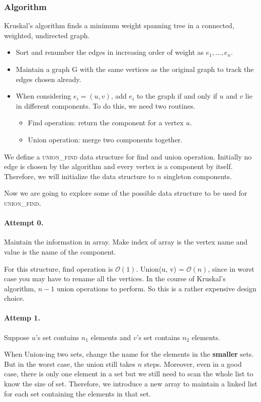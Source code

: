 \subsubsection{Algorithm}
Kruskal's algorithm finds a minimum weight spanning tree in a connected, weighted, undirected graph.
\begin{itemize}
	\item Sort and renumber the edges in increasing order of weight as $ e_1 , \dots, e_n $.
	\item Maintain a graph G with the same vertices as the original graph to track the edges chosen already.
	\item When considering $ e_i = (u, v) $, add $e_i$ to the graph if and only if $u$ and $v$ lie in different components. To do this, we need two routines.
	\begin{itemize}
		\item Find operation: return the component for a vertex $u$.
		\item Union operation: merge two components together.
	\end{itemize}
\end{itemize}
We define a \textsc{union\_find} data structure for find and union operation. Initially no edge is chosen by the algorithm and every vertex is a component by itself. Therefore, we will initialize the data structure to $n$ singleton components.

Now we are going to explore some of the possible data structure to be used for \textsc{union\_find}.

\paragraph{Attempt 0.} Maintain the information in array. Make index of array is the vertex name and value is the name of the component.

For this structure, find operation is $\mathcal{O}(1)$. Union(u, v) = $\mathcal{O}(n) $, since in worst case you may have to rename all the vertices. In the course of Kruskal's algorithm, $n-1$ union operations to perform. So this is a rather expensive design choice.

\paragraph{Attemp 1.} Suppose $u$'s set contains $n_1$ elements and $v$'s set contains $n_2$ elements. 

When Union-ing two sets, change the name for the elements in the \textbf{smaller} sets. But in the worst case, the union still takes $n$ steps. Moreover, even in a good case, there is only one element in a set but we still need to scan the whole list to know the size of set. Therefore, we introduce a new array to maintain a linked list for each set containing the elements in that set.

